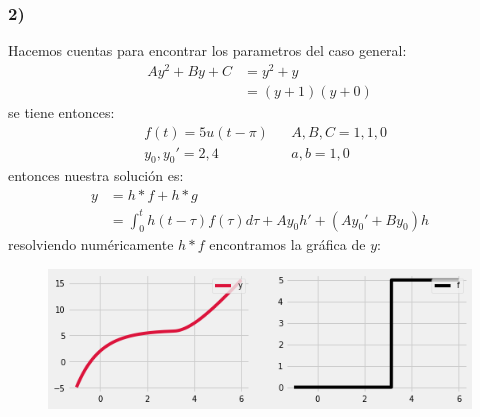 \documentclass{article}
\begin{document}
\begin{tcolorbox}[breakable]
    \subsubsection*{2)}
    Hacemos cuentas para encontrar los parametros del caso general:
    \begin{align*}
        Ay^2 + By + C 
        &= y^2 + y \\
        &= (y+1)(y+0)
    \end{align*}
    se tiene entonces:
    \begin{align*}
        &f(t) = 5u(t-\pi) 
        &&A, B, C = 1,1,0 \\
        &y_0, y_0' = 2, 4 
        &&a,b = 1,0 
    \end{align*}
    entonces nuestra solución es:
    \begin{align*}
        y 
        &= h*f + h*g \\
        &= \int_{0}^t h(t-\tau)f(\tau)d\tau  + Ay_0h' + (Ay_0'+By_0)h 
    \end{align*}
    resolviendo numéricamente $h*f$ encontramos la gráfica de $y$:
    \begin{figure}[H]
        \centering
        \includegraphics[scale=0.7]{images/p1_2.png}
    \end{figure}

\end{tcolorbox}
\end{document}
